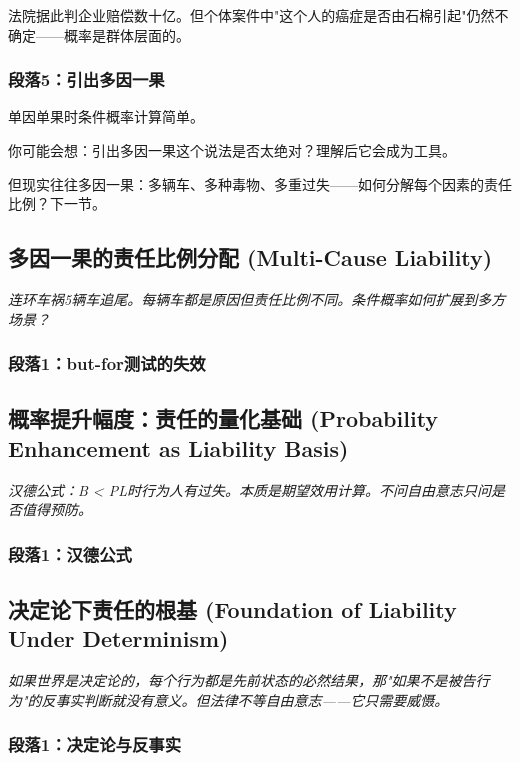 \documentclass[a4paper,12pt]{book}
\newenvironment{motivation}{\begin{tcolorbox}[colback=gray!10,colframe=gray!60,title=\textit{动机}]\small\itshape}{\end{tcolorbox}}
\begin{document}
法院据此判企业赔偿数十亿。但个体案件中"这个人的癌症是否由石棉引起"仍然不确定——概率是群体层面的。

	\subsubsection*{段落5：引出多因一果}
	单因单果时条件概率计算简单。
	\begin{tcolorbox}[colback=yellow!5, title=\textit{读者行为预测}]
		你可能会想：引出多因一果这个说法是否太绝对？理解后它会成为工具。
	\end{tcolorbox}

但现实往往多因一果：多辆车、多种毒物、多重过失——如何分解每个因素的责任比例？下一节。

	\subsection{多因一果的责任比例分配 (Multi-Cause Liability)}
	\begin{motivation}
		连环车祸5辆车追尾。每辆车都是原因但责任比例不同。条件概率如何扩展到多方场景？
	\end{motivation}
	\subsubsection*{段落1：but-for测试的失效}

	\subsection{概率提升幅度：责任的量化基础 (Probability Enhancement as Liability Basis)}
	\begin{motivation}
		汉德公式：B < PL时行为人有过失。本质是期望效用计算。不问自由意志只问是否值得预防。\end{motivation}
	\subsubsection*{段落1：汉德公式}

	\subsection{决定论下责任的根基 (Foundation of Liability Under Determinism)}
	\begin{motivation}如果世界是决定论的，每个行为都是先前状态的必然结果，那"如果不是被告行为"的反事实判断就没有意义。但法律不等自由意志——它只需要威慑。
	\end{motivation}
	\subsubsection*{段落1：决定论与反事实}
\end{document}
